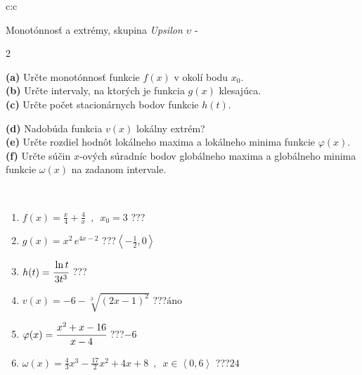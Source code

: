 \documentclass[10pt]{report}
\begin{document}
\begin{tabular}{c:c}
\begin{minipage}[c][104.5mm][t]{0.5\linewidth}
\begin{center}
\vspace{7mm}
{\huge Monotónnosť a extrémy, skupina \textit{Upsilon $\upsilon$} -}\\[5mm]
\begin{minipage}{0.95\linewidth}
\begin{center}
{\small \begin{multicols}{2} \raggedright
\textbf{(a)} Určte monotónnosť funkcie \(f(x)\) v okolí bodu \(x_0\). \\[1mm]
\textbf{(b)} Určte intervaly, na ktorých je funkcia \(g(x)\) klesajúca. \\[1mm]
\textbf{(c)} Určte počet stacionárnych bodov funkcie \(h(t)\). \par \columnbreak
\textbf{(d)} Nadobúda funkcia \(v(x)\) lokálny extrém? \\[1mm]
\textbf{(e)} Určte rozdiel hodnôt lokálneho maxima a lokálneho minima funkcie \(\varphi(x)\). \\[1mm]
\textbf{(f)} Určte súčin \(x\)-ových súradníc bodov globálneho maxima a globálneho minima funkcie \(\omega(x)\) na zadanom intervale. \\[1mm]
\end{multicols}
}
\end{center}
\end{minipage}
\\[4mm]
\begin{minipage}{0.79\linewidth}
\begin{center}
\begin{varwidth}{\linewidth}
\begin{enumerate}
\normalsize
\item $f(x)=\frac{x}{4}+\frac{4}{x} \enspace , \enspace x_0=3$\quad \dotfill\; ???\;\dotfill \quad {}
\item $g(x)=x^2\, e^{4x-2}$\quad \dotfill\; ???\;\dotfill \quad $\left\langle-\frac{1}{2} , 0\right\rangle$
\item $h(t)=\cfrac{\ln t}{3t^3}$\quad \dotfill\; ???\;\dotfill {}
\item $v(x)=-6-\sqrt[3]{(2x-1)^2}$\quad \dotfill\; ???\;\dotfill \quad $\text{áno}$
\item $\varphi(x)=\cfrac{x^2+x-16}{x-4}$\quad \dotfill\; ???\;\dotfill \quad $-6$
\item $\omega(x)=\frac{4}{3}x^3-\frac{17}{2}x^2+4x+8 \enspace , \enspace x\in\left\langle0 , 6\right\rangle$\quad \dotfill\; ???\;\dotfill \quad $24$

\end{enumerate}
\end{varwidth}
\end{center}
\end{minipage}
\end{center}
\end{minipage}
\end{tabular}
\end{document}
